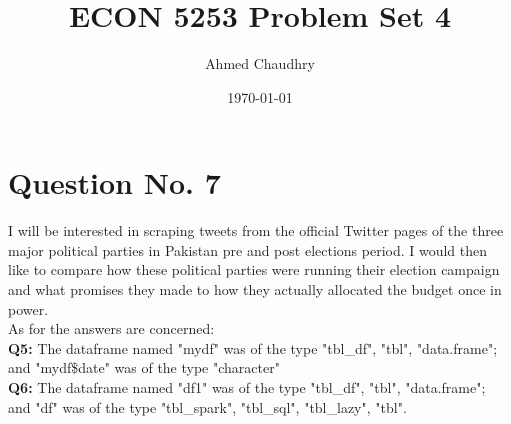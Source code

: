 \documentclass{article}
\title{ECON 5253 Problem Set 4}
\author{Ahmed Chaudhry}
\date{\today}
\begin{document}
\maketitle
\section{Question No. 7}
I will be interested in scraping tweets from the official Twitter pages of the three major political parties in Pakistan pre and post elections period. I would then like to compare how these political parties were running their election campaign and what promises they made to how they actually allocated the budget once in power.\\

As for the answers are concerned:\\
\textbf{Q5:} The dataframe named "mydf" was of the type "tbl\_df", "tbl", "data.frame"; and "mydf\$date" was of the type "character"\\
\textbf{Q6:} The dataframe named "df1" was of the type "tbl\_df", "tbl", "data.frame"; and "df" was of the type "tbl\_spark", "tbl\_sql", "tbl\_lazy", "tbl".
\end{document}
